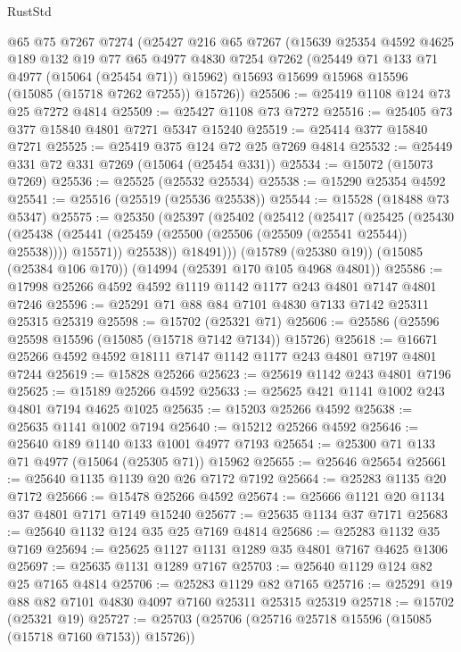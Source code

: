 \begin{lexlean}{RustStd}
\begin{coremodule}
    @65
    @75
    @7267
    @7274
    (@25427
      @216
      @65
      @7267
      (@15639
        @25354
        @4592
        @4625
        @189
        @132
        @19
        @77
        @65
        @4977
        @4830
        @7254
        @7262
        (@25449 @71 @133 @71 @4977 (@15064 (@25454 @71)) @15962)
        @15693
        @15699
        @15968
        @15596
        (@15085 (@15718 @7262 @7255))
        @15726))
@25506 := @25419 @1108 @124 @73 @25 @7272 @4814
@25509 := @25427 @1108 @73 @7272
@25516 := @25405 @73 @377 @15840 @4801 @7271 @5347 @15240
@25519 := @25414 @377 @15840 @7271
@25525 := @25419 @375 @124 @72 @25 @7269 @4814
@25532 := @25449 @331 @72 @331 @7269 (@15064 (@25454 @331))
@25534 := @15072 (@15073 @7269)
@25536 := @25525 (@25532 @25534)
@25538 := @15290 @25354 @4592
@25541 := @25516 (@25519 (@25536 @25538))
@25544 := @15528 (@18488 @73 @5347)
@25575 := @25350
    (@25397
      (@25402
        (@25412
          (@25417
            (@25425
              (@25430
                (@25438 (@25441 (@25459 (@25500 (@25506 (@25509 (@25541 @25544)) @25538)))) @15571))
              @25538))
          @18491)))
    (@15789 (@25380 @19))
    (@15085 (@25384 @106 @170))
    (@14994 (@25391 @170 @105 @4968 @4801))
@25586 := @17998 @25266 @4592 @4592 @1119 @1142 @1177 @243 @4801 @7147 @4801 @7246
@25596 := @25291 @71 @88 @84 @7101 @4830 @7133 @7142 @25311 @25315 @25319
@25598 := @15702 (@25321 @71)
@25606 := @25586 (@25596 @25598 @15596 (@15085 (@15718 @7142 @7134)) @15726)
@25618 := @16671 @25266 @4592 @4592 @18111 @7147 @1142 @1177 @243 @4801 @7197 @4801 @7244
@25619 := @15828 @25266
@25623 := @25619 @1142 @243 @4801 @7196
@25625 := @15189 @25266 @4592
@25633 := @25625 @421 @1141 @1002 @243 @4801 @7194 @4625 @1025
@25635 := @15203 @25266 @4592
@25638 := @25635 @1141 @1002 @7194
@25640 := @15212 @25266 @4592
@25646 := @25640 @189 @1140 @133 @1001 @4977 @7193
@25654 := @25300 @71 @133 @71 @4977 (@15064 (@25305 @71)) @15962
@25655 := @25646 @25654
@25661 := @25640 @1135 @1139 @20 @26 @7172 @7192
@25664 := @25283 @1135 @20 @7172
@25666 := @15478 @25266 @4592
@25674 := @25666 @1121 @20 @1134 @37 @4801 @7171 @7149 @15240
@25677 := @25635 @1134 @37 @7171
@25683 := @25640 @1132 @124 @35 @25 @7169 @4814
@25686 := @25283 @1132 @35 @7169
@25694 := @25625 @1127 @1131 @1289 @35 @4801 @7167 @4625 @1306
@25697 := @25635 @1131 @1289 @7167
@25703 := @25640 @1129 @124 @82 @25 @7165 @4814
@25706 := @25283 @1129 @82 @7165
@25716 := @25291 @19 @88 @82 @7101 @4830 @4097 @7160 @25311 @25315 @25319
@25718 := @15702 (@25321 @19)
@25727 := @25703 (@25706 (@25716 @25718 @15596 (@15085 (@15718 @7160 @7153)) @15726))

\end{coremodule}
\end{lexlean}
